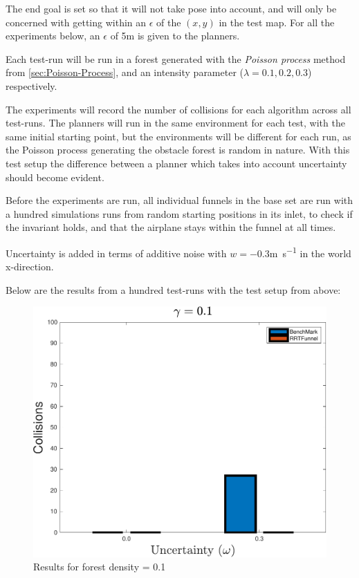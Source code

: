 The end goal is set so that it will not take pose into account, and will only be
concerned with getting within an \(\epsilon\) of the \((x,y)\) in the test map.
For all the experiments below, an \(\epsilon\) of 5\si{\metre} is given to the
planners.

Each test-run will be run in a forest generated with the \textit{Poisson
  process} method from \cref{sec:Poisson-Process}, and an intensity parameter
(\(\lambda = 0.1,0.2,0.3\)) respectively.

The experiments will record the number of collisions for each algorithm across
all test-runs. The planners will run in the same environment for each test, with
the same initial starting point, but the environments will be different for each
run, as the Poisson process generating the obstacle forest is random in nature.
With this test setup the difference between a planner which takes into account
uncertainty should become evident.

Before the experiments are run, all individual funnels in the base set are run
with a hundred simulations runs from random starting positions in its inlet, to
check if the invariant holds, and that the airplane stays within the funnel at
all times.

Uncertainty is added in terms of additive noise with \(w = -0.3\)\si{m.s^{-1}}
in the world x-direction.

Below are the results from a hundred test-runs with the test setup from above:

\begin{figure}
  \centering
  \includegraphics[width=\textwidth]{figures/experiments/ResultPlot01}
  \caption{Results for forest density = 0.1}
  \label{fig:result0.1}
\end{figure}

